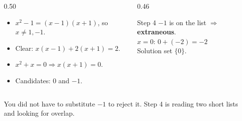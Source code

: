 \documentclass[aspectratio=169, 11pt]{beamer}
\begin{document}
\begin{frame}[t, plain]
  \begin{columns}[T]
    \begin{column}{0.50\textwidth}
      \begin{itemize}\setlength{\itemsep}{3pt}
        \item $x^2-1=(x-1)(x+1)$, so $x\neq1,-1$.
        \item Clear: $x(x-1)+2(x+1)=2$.
        \item $x^2+x=0 \Rightarrow x(x+1)=0$.
        \item Candidates: $0$ and $-1$.
      \end{itemize}
    \end{column}
    \begin{column}{0.46\textwidth}
      \begin{block}{Step 4}
        $-1$ is on the list $\Rightarrow$ \textbf{extraneous}. \\[3pt]
        $x=0$: \; $0+(-2)=-2$ \;\checkmark \\[3pt]
        \centering Solution set $\{0\}$.
      \end{block}
    \end{column}
  \end{columns}
  \vspace{6pt}
  {\footnotesize You did not have to substitute $-1$ to reject it. Step 4 is reading two short lists and
  looking for overlap.}
\end{frame}
\end{document}
